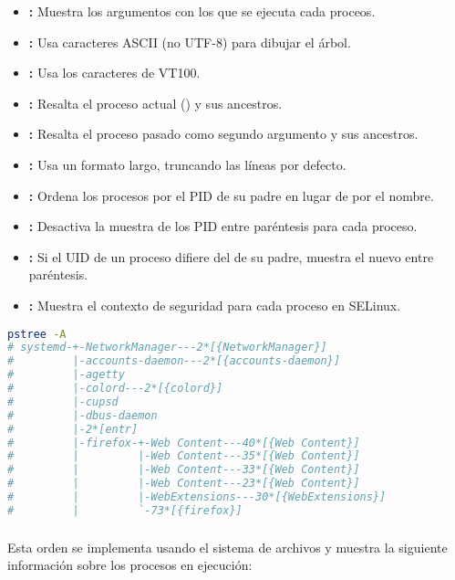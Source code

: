 \begin{itemize}
	\item{}\textbf{:} Muestra los argumentos con los que se ejecuta cada proceos.
	\item{}\textbf{:} Usa caracteres ASCII (no UTF-8) para dibujar el árbol.
	\item{}\textbf{:} Usa los caracteres de VT100.
	\item{}\textbf{:} Resalta el proceso actual () y sus ancestros.
	\item{}\textbf{:} Resalta el proceso pasado como segundo argumento y sus ancestros.
	\item{}\textbf{:} Usa un formato largo, truncando las líneas por defecto.
	\item{}\textbf{:} Ordena los procesos por el PID de su padre en lugar de por el nombre.
	\item{}\textbf{:} Desactiva la muestra de los PID entre paréntesis para cada proceso.
	\item{}\textbf{:} Si el UID de un proceso difiere del de su padre, muestra el nuevo entre paréntesis.
	\item{}\textbf{:} Muestra el contexto de seguridad para cada proceso en SELinux.
\end{itemize}

\begin{lstlisting}[language=Bash]
pstree -A
# systemd-+-NetworkManager---2*[{NetworkManager}]
#         |-accounts-daemon---2*[{accounts-daemon}]
#         |-agetty
#         |-colord---2*[{colord}]
#         |-cupsd
#         |-dbus-daemon
#         |-2*[entr]
#         |-firefox-+-Web Content---40*[{Web Content}]
#         |         |-Web Content---35*[{Web Content}]
#         |         |-Web Content---33*[{Web Content}]
#         |         |-Web Content---23*[{Web Content}]
#         |         |-WebExtensions---30*[{WebExtensions}]
#         |         `-73*[{firefox}]
\end{lstlisting}

\subsubsection{}

Esta orden se implementa usando el sistema de archivos  y muestra la siguiente información sobre los procesos en ejecución:

